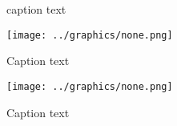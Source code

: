 \documentclass[acmsmall]{acmart}
\begin{document}
\begin{figure}
  \caption{caption text}
  \label{fig:one}
  \end{figure}  
\newpage
\begin{figure}
  \vspace{15pt}
  \texttt{[image: ../graphics/none.png]}
  \caption{Caption text}
  \label{fig:stroke_styles}
\end{figure}
\newpage
\begin{figure*}[htbp]
  \centering
  \texttt{[image: ../graphics/none.png]}
  \caption{Caption text}
  \label{pic:2405}
\end{figure*}
\end{document}
